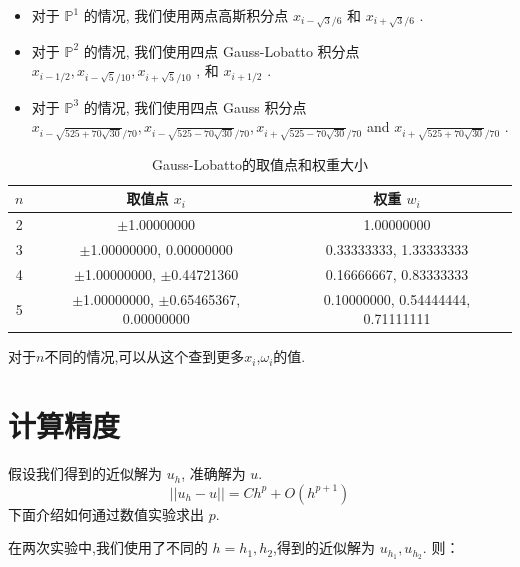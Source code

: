 \documentclass{book}
\begin{document}
\begin{itemize}
    \item 对于  $\mathbb{P}^{1}$  的情况, 我们使用两点高斯积分点  $x_{i-\sqrt{3} / 6}$  和  $x_{i+\sqrt{3} / 6}$ .
    \item 对于  $\mathbb{P}^{2}$  的情况, 我们使用四点 Gauss-Lobatto 积分点  $x_{i-1 / 2}, x_{i-\sqrt{5} / 10}, x_{i+\sqrt{5} / 10}$ , 和  $x_{i+1 / 2}$ .
    \item 对于  $\mathbb{P}^{3}$  的情况, 我们使用四点 Gauss 积分点  $x_{i-\sqrt{525+70 \sqrt{30}} / 70}, x_{i-\sqrt{525-70 \sqrt{30}} / 70}, x_{i+\sqrt{525-70 \sqrt{30}} / 70}$  and  $x_{i+\sqrt{525+70 \sqrt{30}} / 70}$ .
\end{itemize}

\begin{table}[ht]
    \centering
    \caption{Gauss-Lobatto的取值点和权重大小}
    \label{tab:Gauss-Lobatto积分}
    \begin{tabular}{ccc}
        \toprule
        $n$ & 取值点 $x_i$                                 & 权重 $w_i$                         \\
        \midrule
        2   & $\pm$1.00000000                              & 1.00000000                         \\
        3   & $\pm$1.00000000, 0.00000000                  & 0.33333333, 1.33333333             \\
        4   & $\pm$1.00000000, $\pm$0.44721360             & 0.16666667, 0.83333333             \\
        5   & $\pm$1.00000000, $\pm$0.65465367, 0.00000000 & 0.10000000, 0.54444444, 0.71111111 \\
        \bottomrule
    \end{tabular}
\end{table}
对于$n$不同的情况,可以从这个\cite{RN106}查到更多$x_i$,$\omega_i$的值.
\section{计算精度}
假设我们得到的近似解为 $u_h$, 准确解为 $u$.
\begin{equation}
    || u_h-u || = Ch^p + O(h^{p+1})
\end{equation}
下面介绍如何通过数值实验求出 $p$.

在两次实验中,我们使用了不同的 $h=h_1,h_2$,得到的近似解为 $u_{h_1},u_{h_2}$. 则：
\end{document}
